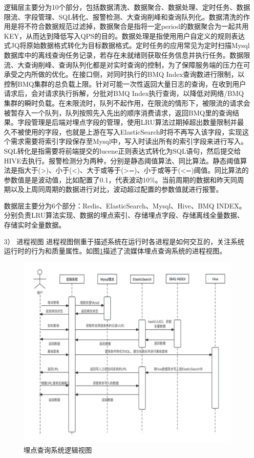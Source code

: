 逻辑层主要分为10个部分，包括数据清洗、数据聚合、数据处理、定时任务、数据限流、字段管理、SQL转化、报警检测、大查询削峰和查询队列化。数据清洗的作用是将不符合数据规范过滤掉，数据聚合是指将一定period的数据聚合为一起共用KEY，从而达到降低写入QPS的目的。数据处理是指使用用户自定义的规则表达式JQ将原始数据格式转化为目标数据格式。定时任务的应用常见为定时扫描Mysql数据库中的离线查询任务记录，若存在未就绪则获取任务信息并执行任务。数据限流、大查询削峰、查询队列化都是对实时查询的控制，为了保障服务端的压力在可承受之内所做的优化。在接口侧，对同时执行的BMQ Index查询数进行限制，以控制BMQ集群的总负载上限。针对可能一次性返回大量日志的查询，在收到用户请求后，会对请求执行拆解，分批对BMQ Index执行查询，以降低对网络/BMQ集群的瞬时负载。在未限流时，队列不起作用，在限流的情形下，被限流的请求会被暂存入一个队列，队列按照先入先出的顺序消费请求，返回BMQ里的查询结果。字段管理是后端对埋点字段的管理，使用LRU算法过期掉超出数量限制并最久不被使用的字段，也就是上游在写入ElasticSearch时将不再写入该字段，实现这个需求需要将索引字段保存至Mysql中，写入时读出所有的索引字段来进行写入。SQL转化是指需要将前端提交的lucene正则表达式转化为SQL语句，然后提交给HIVE去执行。报警检测分为两种，分别是静态阈值算法、同比算法。静态阈值算法是指大于(>)、小于(<)、大于或等于(>=)、小于或等于(<=)阈值。同比算法的参数值是是波动值，比如配置了0.1，代表波动10$\%$。当前周期的数据和昨天同周期以及上周同周期的数据进行对比，波动超过配置的参数值就进行报警。

数据层主要分为6个部分：Redis、ElasticSearch、Mysql、Hive、BMQ INDEX。
分别负责LRU算法实现、数据的埋点索引、存储埋点字段、存储离线全量数据、存储实时全量数据。

3）	进程视图
进程视图侧重于描述系统在运行时各进程是如何交互的，关注系统运行时的行为和质量属性。如图\ref{xitongjincheng}描述了流媒体埋点查询系统的进程视图。
 \begin{figure}[htb]
  \centering
  \includegraphics[width=5in]{figure/chapter4/系统进程视图.jpg}
  \caption{埋点查询系统逻辑视图}\label{xitongjincheng}
\end{figure}

